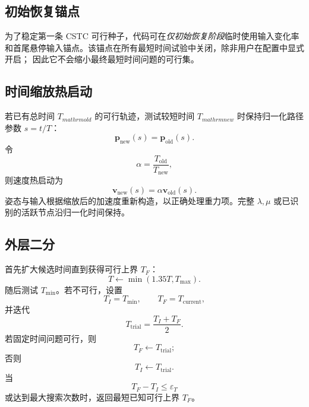 \documentclass[UTF8,a4paper,11pt]{ctexart}
\begin{document}
\subsection{初始恢复锚点}

为了稳定第一条 CSTC 可行种子，代码可在\emph{仅初始恢复阶段}临时使用输入变化率
和首尾悬停输入锚点。该锚点在所有最短时间试验中关闭，除非用户在配置中显式开启；
因此它不会缩小最终最短时间问题的可行集。

\subsection{时间缩放热启动}

若已有总时间 $T_{mathrm{old}}$ 的可行轨迹，测试较短时间
$T_{mathrm{new}}$ 时保持归一化路径参数 $s=t/T$：
\begin{equation}
  \bm p_{\mathrm{new}}(s)=\bm p_{\mathrm{old}}(s).
  \label{eq:warm-position}
\end{equation}
令
\begin{equation}
  \alpha=\frac{T_{\mathrm{old}}}{T_{\mathrm{new}}},
\end{equation}
则速度热启动为
\begin{equation}
  \bm v_{\mathrm{new}}(s)=\alpha\bm v_{\mathrm{old}}(s).
  \label{eq:warm-velocity}
\end{equation}
姿态与输入根据缩放后的加速度重新构造，以正确处理重力项。完整 $\lambda,\mu$
或已识别的活跃节点沿归一化时间保持。

\subsection{外层二分}

首先扩大候选时间直到获得可行上界 $T_F$：
\begin{equation}
  T\leftarrow\min(1.35T,T_{\max}).
  \label{eq:expand-time}
\end{equation}
随后测试 $T_{\min}$。若不可行，设置
\[
  T_I=T_{\min},\qquad T_F=T_{\mathrm{current}},
\]
并迭代
\begin{equation}
  T_{\mathrm{trial}}=\frac{T_I+T_F}{2}.
  \label{eq:bisection-trial}
\end{equation}
若固定时间问题可行，则
\[
  T_F\leftarrow T_{\mathrm{trial}};
\]
否则
\[
  T_I\leftarrow T_{\mathrm{trial}}.
\]
当
\begin{equation}
  T_F-T_I\leq\varepsilon_T
  \label{eq:bisection-stop}
\end{equation}
或达到最大搜索次数时，返回最短已知可行上界 $T_F$。
\end{document}
